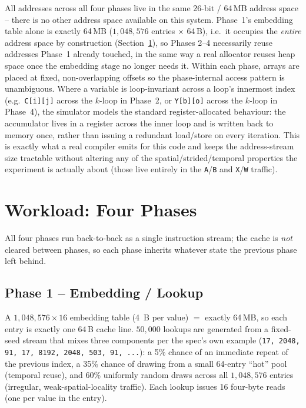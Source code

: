 \documentclass[11pt]{article}
\begin{document}
All addresses across all four phases live in the same 26-bit / 64\,MB
address space -- there is no other address space available on this
system. Phase~1's embedding table alone is exactly 64\,MB
($1{,}048{,}576$ entries $\times$ 64\,B), i.e.\ it occupies the
\emph{entire} address space by construction (Section~\ref{sec:phases}), so
Phases 2--4 necessarily reuse addresses Phase~1 already touched, in the
same way a real allocator reuses heap space once the embedding stage no
longer needs it. Within each phase, arrays are placed at fixed,
non-overlapping offsets so the phase-internal access pattern is
unambiguous. Where a variable is loop-invariant across a loop's innermost
index (e.g.\ \texttt{C[i][j]} across the $k$-loop in Phase~2, or
\texttt{Y[b][o]} across the $k$-loop in Phase~4), the simulator models the
standard register-allocated behaviour: the accumulator lives in a register
across the inner loop and is written back to memory once, rather than
issuing a redundant load/store on every iteration. This is exactly what a
real compiler emits for this code and keeps the address-stream size
tractable without altering any of the spatial/strided/temporal properties
the experiment is actually about (those live entirely in the
\texttt{A}/\texttt{B} and \texttt{X}/\texttt{W} traffic).

\section{Workload: Four Phases}
\label{sec:phases}

All four phases run back-to-back as a single instruction stream; the cache
is \emph{not} cleared between phases, so each phase inherits whatever
state the previous phase left behind.

\subsection{Phase 1 -- Embedding / Lookup}
A $1{,}048{,}576 \times 16$ embedding table (4~B per value) $=$ exactly
64\,MB, so each entry is exactly one 64\,B cache line. $50{,}000$ lookups
are generated from a fixed-seed stream that mixes three components per the
spec's own example (\texttt{17, 2048, 91, 17, 8192, 2048, 503, 91, ...}):
a 5\% chance of an immediate repeat of the previous index, a 35\% chance
of drawing from a small 64-entry ``hot'' pool (temporal reuse), and 60\%
uniformly random draws across all $1{,}048{,}576$ entries (irregular,
weak-spatial-locality traffic). Each lookup issues 16 four-byte reads
(one per value in the entry).
\end{document}
